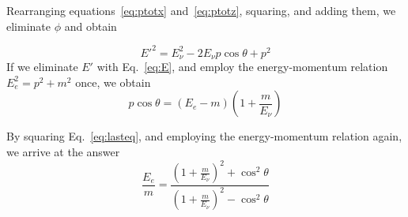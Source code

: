 \documentclass{beamer}
\begin{document}
\begin{frame}[allowframebreaks]{}
Rearranging equations~\eqref{eq:ptotx} and~\eqref{eq:ptotz}, squaring, and adding them, we eliminate $\phi$ and obtain

\begin{equation}
  E'^2 = E^2_\nu -2E_\nu p\cos\theta+p^2
\end{equation}
If we eliminate $E'$ with Eq.~\eqref{eq:E}, and employ the energy-momentum relation $E_e^2=p^2+m^2$ once, we obtain
\begin{equation} \label{eq:lasteq}
  p\cos\theta=(E_e-m)\left( 1+\frac{m}{E_\nu} \right)
\end{equation}

\framebreak

By squaring Eq.~\eqref{eq:lasteq}, and employing the energy-momentum relation again, we arrive at the answer
\begin{equation}
  \frac{E_e}{m}=\frac{\left( 1+\frac{m}{E_\nu} \right)^2+\cos^2\theta}{\left( 1+\frac{m}{E_\nu} \right)^2-\cos^2\theta}
\end{equation}

\end{frame}
\end{document}
